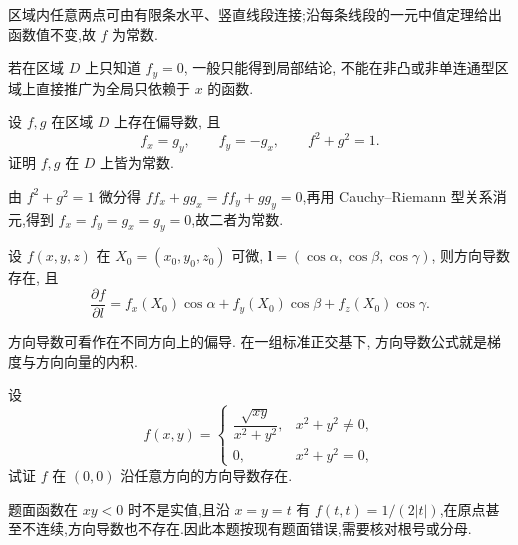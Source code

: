 \begin{solution}
    区域内任意两点可由有限条水平、竖直线段连接;沿每条线段的一元中值定理给出函数值不变,故 $f$ 为常数.
\end{solution}

\begin{remark}
    若在区域 $D$ 上只知道 $f_y=0$, 一般只能得到局部结论, 不能在非凸或非单连通型区域上直接推广为全局只依赖于 $x$ 的函数.
\end{remark}

\begin{example}
    设 $f,g$ 在区域 $D$ 上存在偏导数, 且
    \[
        f_x=g_y,\qquad f_y=-g_x,\qquad f^2+g^2=1.
    \]
    证明 $f,g$ 在 $D$ 上皆为常数.
\end{example}
\exampleblank

\begin{solution}
    由 $f^2+g^2=1$ 微分得 $ff_x+gg_x=ff_y+gg_y=0$,再用 Cauchy--Riemann 型关系消元,得到 $f_x=f_y=g_x=g_y=0$,故二者为常数.
\end{solution}

\begin{theorem}[\markstar]
    设 $f(x,y,z)$ 在 $X_0=(x_0,y_0,z_0)$ 可微, $\bm l=(\cos\alpha,\cos\beta,\cos\gamma)$, 则方向导数存在, 且
    \[
        \dfrac{\partial f}{\partial l}
        =f_x(X_0)\cos\alpha+f_y(X_0)\cos\beta+f_z(X_0)\cos\gamma.
    \]
\end{theorem}

\begin{remark}
    方向导数可看作在不同方向上的偏导. 在一组标准正交基下, 方向导数公式就是梯度与方向向量的内积.
\end{remark}

\begin{example}
    设
    \[
        f(x,y)=
        \begin{cases}
            \dfrac{\sqrt{xy}}{x^2+y^2}, & x^2+y^2\ne0, \\
            0,                          & x^2+y^2=0,
        \end{cases}
    \]
    试证 $f$ 在 $(0,0)$ 沿任意方向的方向导数存在.
\end{example}
\exampleblank

\begin{solution}
    题面函数在 $xy<0$ 时不是实值,且沿 $x=y=t$ 有 $f(t,t)=1/(2|t|)$,在原点甚至不连续,方向导数也不存在.因此本题按现有题面错误,需要核对根号或分母.
\end{solution}

